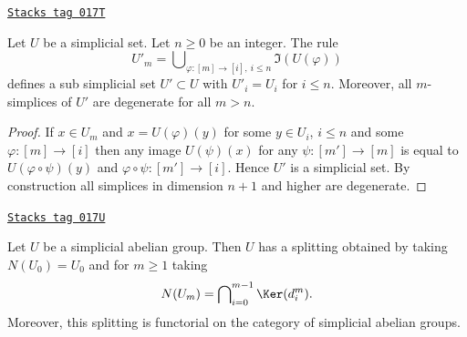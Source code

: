 \begin{lemma}
\label{simplicial-lemma-simplicial-set-n-skel-sub}
\href{https://stacks.math.columbia.edu/tag/017T}{\texttt{Stacks tag 017T}}

Let $U$ be a simplicial set.
Let $n \geq 0$ be an integer.
The rule
$$
U'_m = \bigcup\nolimits_{\varphi : [m] \to [i], \ i\leq n} \Im(U(\varphi))
$$
defines a sub simplicial set $U' \subset U$ with
$U'_i = U_i$ for $i \leq n$.
Moreover, all $m$-simplices of $U'$ are degenerate for
all $m > n$.
\end{lemma}

\begin{proof}
If $x \in U_m$ and $x = U(\varphi)(y)$
for some $y \in U_i$, $i \leq n$ and some $\varphi : [m] \to [i]$
then any image $U(\psi)(x)$ for any $\psi : [m'] \to [m]$ is
equal to $U(\varphi \circ \psi)(y)$ and $\varphi \circ \psi :
[m'] \to [i]$. Hence $U'$ is a simplicial set. By construction
all simplices in dimension $n + 1$ and higher are degenerate.
\end{proof}

\begin{lemma}
\label{simplicial-lemma-splitting-simplicial-groups}
\href{https://stacks.math.columbia.edu/tag/017U}{\texttt{Stacks tag 017U}}

Let $U$ be a simplicial abelian group.
Then $U$ has a splitting obtained by taking $N(U_0) = U_0$ and
for $m \geq 1$ taking
$$
N(U_m) = \bigcap\nolimits_{i = 0}^{m - 1} \Ker(d^m_i).
$$
Moreover, this splitting is functorial on the category
of simplicial abelian groups.
\end{lemma}

